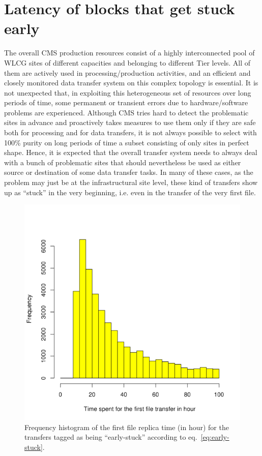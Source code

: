 \section{Latency of blocks that get stuck early}

The overall CMS production resources consist of a highly
interconnected pool of WLCG sites of different capacities and
belonging to different Tier levels. All of them are actively used in
processing/production activities, and an efficient and closely
monitored data transfer system on this complex topology is
essential. It is not unexpected that, in exploiting this heterogeneous
set of resources over long periods of time, some permanent or
transient errors due to hardware/software problems are
experienced. Although CMS tries hard to detect the problematic sites
in advance and proactively takes measures to use them only if they are
safe both for processing and for data transfers, it is not always
possible to select with 100\% purity on long periods of time a subset
consisting of only sites in perfect shape. Hence, it is expected that
the overall transfer system needs to always deal with a bunch of
problematic sites that should nevertheless be used as either source or
destination of some data transfer tasks. In many of these cases, as
the problem may just be at the infrastructural site level, these kind
of transfers show up as “stuck” in the very beginning, i.e. even in
the transfer of the very first file.

\begin{figure}[htp]
\centering
\includegraphics{Figures/figure-71.pdf}
\caption{Frequency histogram of the first file replica time (in hour)
  for the transfers tagged as being ``early-stuck'' according to
  eq.~\ref{eq:early-stuck}.}\label{fig:figure-7.1}
\end{figure}

